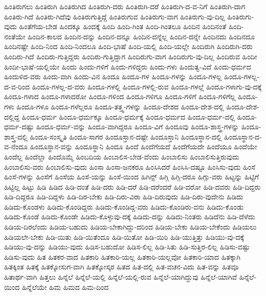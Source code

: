 {ಹಿಂತಿರುಗಲು
ಹಿಂತಿರುಗಿ
ಹಿಂತಿರುಗಿದ
ಹಿಂತಿರುಗಿ-ದರು
ಹಿಂತಿರುಗಿ-ದರೆ
ಹಿಂತಿರುಗಿ-ದ-ವ-ನಿಗೆ
ಹಿಂತಿರುಗಿ-ದಾಗ
ಹಿಂತಿರು-ಗಿದೆ
ಹಿಂತಿರು-ಗಿದೆವು
ಹಿಂತಿರುಗುತ್ತಿದ್ದೆ
ಹಿಂತಿರುಗುವ
ಹಿಂತಿರುಗು-ವಾಗ
ಹಿಂತಿರುಗು-ವು-ದಿಲ್ಲ
ಹಿಂತಿರುಗು-ವುದು
ಹಿಂತೆಗೆಯ-ಬೇಡ
ಹಿಂದಕ್ಕೂ
ಹಿಂದಕ್ಕೆ
ಹಿಂದಿ
ಹಿಂದಿ-ಗಿಂತ
ಹಿಂದಿ-ಗಿಂತಲೂ
ಹಿಂದಿನ
ಹಿಂದಿನಂತೆ
ಹಿಂದಿ-ನಂತೆಯೇ
ಹಿಂದಿನ-ಕಾಲದ
ಹಿಂದಿನ-ದನ್ನು
ಹಿಂದಿನ-ದನ್ನೂ
ಹಿಂದಿನ-ದನ್ನೆಲ್ಲ
ಹಿಂದಿನ-ದನ್ನೇ
ಹಿಂದಿನದು
ಹಿಂದಿನದೂ
ಹಿಂದಿನಷ್ಟೇ
ಹಿಂದಿ-ನಿಂದ
ಹಿಂದಿ-ನಿಂದಲೂ
ಹಿಂದಿ-ಭಾಷೆ
ಹಿಂದಿ-ಯಲ್ಲಿ
ಹಿಂದಿ-ಯಲ್ಲೇ
ಹಿಂದಿರುಗಿ
ಹಿಂದಿರುಗಿ-ದರು
ಹಿಂದಿರು-ಗಿದೆ
ಹಿಂದಿರು-ಗುತ್ತಿದ್ದರು
ಹಿಂದಿರು-ಗುತ್ತಿದ್ದಾಗ
ಹಿಂದಿರುಗು-ವಾಗ
ಹಿಂದಿರುಗು-ವು-ದಿಲ್ಲ
ಹಿಂದಿರುವ
ಹಿಂದೀ
ಹಿಂದೀ-ಭಾಷೆ-ಯಲ್ಲಿಯೇ
ಹಿಂದು
ಹಿಂದು-ಗಳಿಗೆ
ಹಿಂದು-ಗಳಿದ್ದರು
ಹಿಂದು-ಗಳು
ಹಿಂದುತ್ವ-ವಿದೆ
ಹಿಂದು-ಧರ್ಮದ
ಹಿಂದುಳಿದ-ವರು
ಹಿಂದು-ವಾಗಿ
ಹಿಂದು-ವಿನ
ಹಿಂದೂ
ಹಿಂದೂ-ಗಳ
ಹಿಂದೂ-ಗಳನ್ನು
ಹಿಂದೂ-ಗಳಲ್ಲ
ಹಿಂದೂ-ಗಳಲ್ಲ-ದ-ವ-ರಿಂದ
ಹಿಂದೂ-ಗಳಲ್ಲ-ದ-ವರು
ಹಿಂದೂ-ಗಳಲ್ಲಿ
ಹಿಂದೂ-ಗಳಲ್ಲಿ-ರುವ
ಹಿಂದೂ-ಗಳಲ್ಲೆ
ಹಿಂದೂ-ಗಳಾಗು-ವು-ದಕ್ಕೆ
ಹಿಂದೂ-ಗಳಾದ
ಹಿಂದೂ-ಗಳಾದರೋ
ಹಿಂದೂ-ಗಳಿಂದ
ಹಿಂದೂ-ಗಳಿಗೂ
ಹಿಂದೂ-ಗಳಿಗೆ
ಹಿಂದೂ-ಗಳಿಗೆಲ್ಲ
ಹಿಂದೂ-ಗಳು
ಹಿಂದೂ-ಗಳೂ
ಹಿಂದೂ-ಗಳೆಲ್ಲರೂ
ಹಿಂದೂ-ತತ್ತ್ವ-ಗಳನ್ನು
ಹಿಂದೂ-ದೇಶದ
ಹಿಂದೂ-ದೇಶ-ದಲ್ಲಿ
ಹಿಂದೂ-ದೇಶ-ದಲ್ಲಿದ್ದ
ಹಿಂದೂ-ಧರ್ಮ
ಹಿಂದೂ-ಧರ್ಮಕ್ಕೂ
ಹಿಂದೂ-ಧರ್ಮಕ್ಕೆ
ಹಿಂದೂ-ಧರ್ಮದ
ಹಿಂದೂ-ಧರ್ಮ-ದಲ್ಲಿ
ಹಿಂದೂ-ಧರ್ಮ-ದಷ್ಟು
ಹಿಂದೂ-ಧರ್ಮ-ವನ್ನು
ಹಿಂದೂ-ವಾಗಿದ್ದರೂ
ಹಿಂದೂ-ವಿಗೆ
ಹಿಂದೂವು
ಹಿಂದೂ-ಶಾಸ್ತ್ರ-ಗಳನ್ನು
ಹಿಂದೂ-ಶಾಸ್ತ್ರ-ದಲ್ಲಿ
ಹಿಂದೂ-ಸಂಸ್ಕೃತಿ
ಹಿಂದೂ-ಸಾಗರ
ಹಿಂದೂಸ್ತಾನ-ದಷ್ಟೇ
ಹಿಂದೂಸ್ತಾನಿ
ಹಿಂದೂಸ್ಥಾನ-ದಲ್ಲಿ
ಹಿಂದೂಸ್ಥಾನ-ದ-ವ-ನೆಂದೂ
ಹಿಂದೂಸ್ಥಾನ-ವನ್ನು
ಹಿಂದೂಸ್ಥಾನಿ
ಹಿಂದೂ
ಹಿಂದೆ
ಹಿಂದೆಗೆಯದೆ
ಹಿಂದೆಗೆಯದೇ
ಹಿಂದೆಯೂ
ಹಿಂದೆಯೇ
ಹಿಂದೆಲ್ಲ
ಹಿಂದೆಲ್ಲಾ
ಹಿಂದೊಮ್ಮೆ
ಹಿಂಬದಿಯ
ಹಿಂಬಾಲಿಸ-ಬೇಡ-ವೆಂದು
ಹಿಂಬಾಲಿಸು
ಹಿಂಬಾಲಿಸುತ್ತಿರುವುದು
ಹಿಂಬಾಲಿಸು-ವರು
ಹಿಂಬಾಲಿಸು-ವುದು
ಹಿಂಸಾ
ಹಿಂಸಾ-ಜನಕರೂ
ಹಿಂಸಿಸಿದರೆ
ಹಿಂಸಿಸಿ-ದಷ್ಟೂ
ಹಿಂಸಿಸು-ವುದು
ಹಿಂಸೆ
ಹಿಂಸೆ-ಗಳನ್ನು
ಹಿಂಸೆಗೆ
ಹಿಂಸೆಯ
ಹಿಂಸೆ-ಯನ್ನು
ಹಿಂಸೆ-ಯಿಂದ
ಹಿಗಿನ್ಸ್
ಹಿಗ್ಗಿ
ಹಿಗ್ಗಿ-ದರೂ
ಹಿಗ್ಗು-ವರು
ಹಿಟ್ಟನ್ನು
ಹಿಟ್ಟಿಗೆ
ಹಿಟ್ಟಿಲ್ಲ
ಹಿಟ್ಟು
ಹಿಡಿ
ಹಿಡಿದ
ಹಿಡಿ-ದಂತೆ
ಹಿಡಿ-ದರು
ಹಿಡಿ-ದರೆ
ಹಿಡಿ-ದರೆಂದರೆ
ಹಿಡಿ-ದರೋ
ಹಿಡಿ-ದವರು
ಹಿಡಿ-ದಿದ್ದರು
ಹಿಡಿ-ದಿದ್ದರೂ
ಹಿಡಿ-ದಿದ್ದಳು
ಹಿಡಿ-ದಿರ-ಬೇಕು
ಹಿಡಿ-ದಿರು-ವಿರಾ
ಹಿಡಿ-ದಿರುವುದು
ಹಿಡಿ-ದಿರು-ವುದೇನು
ಹಿಡಿದು
ಹಿಡಿದು-ಕೊಂಡಳು
ಹಿಡಿದು-ಕೊಂಡಿದ್ದರು
ಹಿಡಿದು-ಕೊಂಡಿದ್ದ-ವರು
ಹಿಡಿದು-ಕೊಂಡಿರು-ವನು
ಹಿಡಿದು-ಕೊಂಡು
ಹಿಡಿದು-ಕೊಂಡೆ
ಹಿಡಿದು-ಕೊಂಡೇ
ಹಿಡಿದು-ಕೊಳ್ಳುವು-ದಕ್ಕೆ
ಹಿಡಿದು-ದನ್ನು
ಹಿಡಿದು-ನಿಂತರು
ಹಿಡಿದೆನು
ಹಿಡಿ-ದೆಳೆದು
ಹಿಡಿಯ-ದಿರಲೆಂದು
ಹಿಡಿಯ-ಬಹುದು
ಹಿಡಿಯ-ಬೇಕಾಗಿದ್ದು-ದರಿಂದ
ಹಿಡಿಯ-ಬೇಕು
ಹಿಡಿಯ-ಬೇಕೆಂದು
ಹಿಡಿಯಲು
ಹಿಡಿಯಲೇ-ಬೇಕು
ಹಿಡಿ-ಯಿತು
ಹಿಡಿ-ಯಿತೆಂದೂ
ಹಿಡಿ-ಯಿತೋ
ಹಿಡಿ-ಯಿರಿ
ಹಿಡಿ-ಯುತ್ತಿತ್ತು
ಹಿಡಿಯು-ವು-ದಕ್ಕೆ
ಹಿಡಿಯು-ವು-ದನ್ನು
ಹಿಡಿಯು-ವುದು
ಹಿಡಿಸ-ಬಹುದೋ
ಹಿಡಿಸ-ಲಿಲ್ಲ
ಹಿಡಿ-ಸಿತು
ಹಿಡಿ-ಸುತ್ತಿರ-ಲಿಲ್ಲ
ಹಿಡಿಸು-ವಷ್ಟು
ಹಿಡಿಸು-ವುದು
ಹಿತ
ಹಿತಕರ-ವಾದ
ಹಿತಕಾರಿ
ಹಿತಕಾರಿ-ಯಲ್ಲ
ಹಿತಕಾರಿ-ಯಲ್ಲವೋ
ಹಿತಕಾರಿ-ಯಾದ
ಹಿತಕ್ಕಾಗಿ
ಹಿತಕ್ಕಿಂತ
ಹಿತಕ್ಕೆ
ಹಿತಕ್ಕೋಸುಗ-ವಾಗಿ
ಹಿತಕ್ಕೋಸ್ಕರ
ಹಿತದ
ಹಿತ-ದಲ್ಲಿ
ಹಿತ-ವಚನ-ವಿದು
ಹಿತ-ವನ್ನು
ಹಿತವೂ
ಹಿತಾರ್ಥ-ವಾಗಿ
ಹಿತ್ತಲು
ಹಿನ್ನೆಲೆ
ಹಿನ್ನೆಲೆ-ಯಲ್ಲಿ
ಹಿನ್ನೆಲೆ-ಯಲ್ಲಿ-ರುವ
ಹಿನ್ನೆಲೆ-ಯಾಗಿದ್ದುವು
ಹಿನ್ನೆಲೆ-ಯಾಗಿವೆ
ಹಿನ್ನೆಲೆ-ಯಿಂದ
ಹಿನ್ನೆಲೆಯೇ
ಹಿಮ
ಹಿಮದ
ಹಿಮ-ದಿಂದ
}
